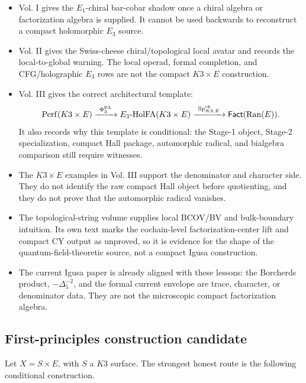 \begin{itemize}
\item Vol. I gives the \(E_1\)-chiral bar-cobar shadow once a chiral
algebra or factorization algebra is supplied.  It cannot be used
backwards to reconstruct a compact holomorphic \(E_3\) source.

\item Vol. II gives the Swiss-cheese chiral/topological local avatar and
records the local-to-global warning.  The local operad, formal
completion, and CFG/holographic \(E_3\) rows are not the compact
\(K3\times E\) construction.

\item Vol. III gives the correct architectural template:
\[
       \mathrm{Perf}(K3\times E)
       \xrightarrow{\ \Phi^{\mathrm{FA}}_3\ }
       E_3\text{-}\mathrm{HolFA}(K3\times E)
       \xrightarrow{\ \mathrm{Sp}^{\mathrm{ch}}_{K3,E}\ }
       \mathsf{Fact}(\mathrm{Ran}(E)).
\]
It also records why this template is conditional: the Stage-1 object,
Stage-2 specialization, compact Hall package, automorphic radical, and
bialgebra comparison still require witnesses.

\item The \(K3\times E\) examples in Vol. III support the denominator
and character side.  They do not identify the raw compact Hall object
before quotienting, and they do not prove that the automorphic radical
vanishes.

\item The topological-string volume supplies local BCOV/BV and
bulk-boundary intuition.  Its own text marks the cochain-level
factorization-center lift and compact CY output as unproved, so it is
evidence for the shape of the quantum-field-theoretic source, not a
compact Igusa construction.

\item The current Igusa paper is already aligned with these lessons:
the Borcherds product, \(-\Delta_5^{-2}\), and the formal current
envelope are trace, character, or denominator data.  They are not the
microscopic compact factorization algebra.
\end{itemize}

\subsection{First-principles construction candidate}

Let \(X=S\times E\), with \(S\) a \(K3\) surface.  The strongest honest
route is the following conditional construction.

